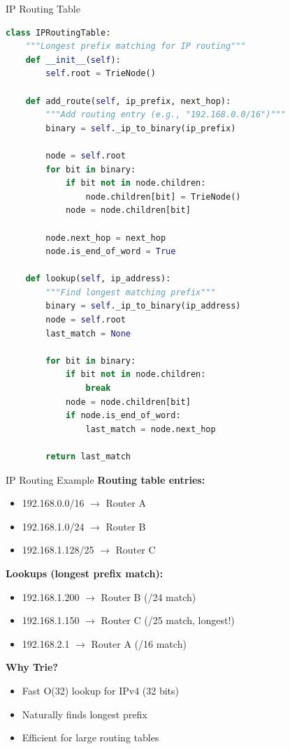 \documentclass[aspectratio=169]{beamer}
\begin{document}
\begin{frame}[fragile]{IP Routing Table}
  \begin{lstlisting}[language=Python, basicstyle=\ttfamily\footnotesize]
class IPRoutingTable:
    """Longest prefix matching for IP routing"""
    def __init__(self):
        self.root = TrieNode()

    def add_route(self, ip_prefix, next_hop):
        """Add routing entry (e.g., "192.168.0.0/16")"""
        binary = self._ip_to_binary(ip_prefix)

        node = self.root
        for bit in binary:
            if bit not in node.children:
                node.children[bit] = TrieNode()
            node = node.children[bit]

        node.next_hop = next_hop
        node.is_end_of_word = True

    def lookup(self, ip_address):
        """Find longest matching prefix"""
        binary = self._ip_to_binary(ip_address)
        node = self.root
        last_match = None

        for bit in binary:
            if bit not in node.children:
                break
            node = node.children[bit]
            if node.is_end_of_word:
                last_match = node.next_hop

        return last_match
  \end{lstlisting}
\end{frame}

\begin{frame}{IP Routing Example}
  \textbf{Routing table entries:}
  \begin{itemize}
    \item 192.168.0.0/16 $\rightarrow$ Router A
    \item 192.168.1.0/24 $\rightarrow$ Router B
    \item 192.168.1.128/25 $\rightarrow$ Router C
  \end{itemize}

  \vspace{0.3cm}
  \textbf{Lookups (longest prefix match):}
  \begin{itemize}
    \item 192.168.1.200 $\rightarrow$ Router B (/24 match)
    \item 192.168.1.150 $\rightarrow$ Router C (/25 match, longest!)
    \item 192.168.2.1 $\rightarrow$ Router A (/16 match)
  \end{itemize}

  \vspace{0.3cm}
  \textbf{Why Trie?}
  \begin{itemize}
    \item Fast O(32) lookup for IPv4 (32 bits)
    \item Naturally finds longest prefix
    \item Efficient for large routing tables
  \end{itemize}
\end{frame}
\end{document}
